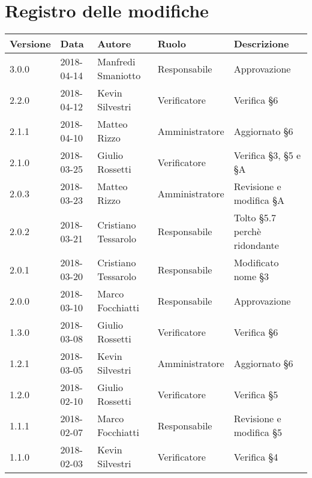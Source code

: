 \documentclass[./PianodiProgetto.tex]{subfiles}
\begin{document}
\chapter*{Registro delle modifiche}
\setlength\LTleft{-22mm}
\begin{longtable}{|p{20mm}|p{20mm}|p{40mm}|p{30mm}|p{50mm}|}
	\hline
	\textbf{Versione} & \textbf{Data} & \textbf{Autore} & \textbf{Ruolo} & \textbf{Descrizione} \\ 
	
		\hline 3.0.0 & 2018-04-14 & Manfredi Smaniotto & Responsabile & Approvazione \\
	
		\hline 2.2.0 & 2018-04-12 & Kevin Silvestri & Verificatore & Verifica §6 \\
	
		\hline 2.1.1 & 2018-04-10 & Matteo Rizzo & Amministratore & Aggiornato §6 \\ 
		
		\hline 2.1.0 & 2018-03-25 & Giulio Rossetti & Verificatore & Verifica §3, §5 e §A  \\
	
		\hline 2.0.3 & 2018-03-23 & Matteo Rizzo & Amministratore & Revisione e modifica §A \\
		
		\hline 2.0.2 & 2018-03-21 & Cristiano Tessarolo & Responsabile & Tolto §5.7 perchè ridondante \\
	
		\hline 2.0.1 & 2018-03-20 & Cristiano Tessarolo & Responsabile & Modificato nome §3 \\
	
		\hline 2.0.0 & 2018-03-10 & Marco Focchiatti & Responsabile & Approvazione \\
		
		\hline 1.3.0 & 2018-03-08 & Giulio Rossetti & Verificatore & Verifica §6 \\
		
		\hline 1.2.1 & 2018-03-05 & Kevin Silvestri & Amministratore & Aggiornato §6 \\
		
		\hline 1.2.0 & 2018-02-10 & Giulio Rossetti & Verificatore & Verifica §5 \\
		
		\hline 1.1.1 & 2018-02-07 & Marco Focchiatti & Responsabile & Revisione e modifica §5 \\
		
		\hline 1.1.0 & 2018-02-03 & Kevin Silvestri & Verificatore & Verifica §4 \\
				

\end{longtable}
\end{document}

